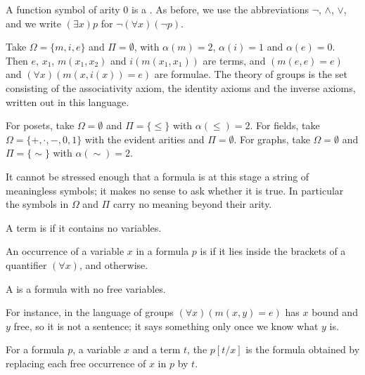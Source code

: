 \documentclass[a4paper]{scrartcl}
\begin{document}
A function symbol of arity $0$ is a . As before, we use the abbreviations $\lnot$, $\land$, $\lor$, and we write $(\exists x) p$ for $\lnot (\forall x)(\lnot p)$.

\begin{example}
  Take $\Omega = \{m, i, e\}$ and $\Pi = \emptyset$, with $\alpha(m) = 2$, $\alpha(i) = 1$ and $\alpha(e) = 0$. Then $e$, $x_1$, $m(x_1, x_2)$ and $i(m(x_1,x_1))$ are terms, and $(m(e, e) = e)$ and $(\forall x)(m(x, i(x)) = e)$ are formulae. The theory of groups is the set consisting of the associativity axiom, the identity axioms and the inverse axioms, written out in this language.
\end{example}

\begin{example}
  For posets, take $\Omega = \emptyset$ and $\Pi = \{\leq\}$ with $\alpha(\leq) = 2$. For fields, take $\Omega = \{+, \cdot, -, 0, 1\}$ with the evident arities and $\Pi = \emptyset$. For graphs, take $\Omega = \emptyset$ and $\Pi = \{\sim\}$ with $\alpha(\sim) = 2$.
\end{example}

It cannot be stressed enough that a formula is at this stage a string of meaningless symbols; it makes no sense to ask whether it is true. In particular the symbols in $\Omega$ and $\Pi$ carry no meaning beyond their arity.

\begin{definition}
  A term is  if it contains no variables.
\end{definition}

\begin{definition}
  An occurrence of a variable $x$ in a formula $p$ is  if it lies inside the brackets of a quantifier $(\forall x)$, and  otherwise.
\end{definition}

\begin{definition}[Sentence]
  A  is a formula with no free variables.
\end{definition}

For instance, in the language of groups $(\forall x)(m(x, y) = e)$ has $x$ bound and $y$ free, so it is not a sentence; it says something only once we know what $y$ is.

\begin{definition}[Substitution]
  For a formula $p$, a variable $x$ and a term $t$, the  $p[t/x]$ is the formula obtained by replacing each free occurrence of $x$ in $p$ by $t$.
\end{definition}
\end{document}
